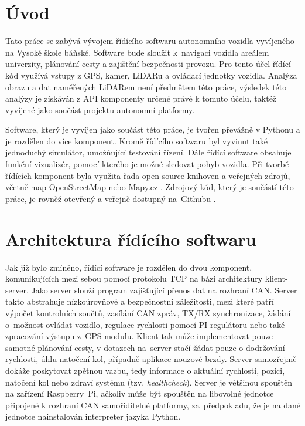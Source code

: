 \documentclass[czech, bachelor]{diploma}
\begin{document}
\MakeTitlePages

\chapter{Úvod} \label{sec:Introduction}
Tato práce se zabývá vývojem řídícího softwaru autonomního vozidla vyvíjeného na Vysoké škole báňské. Software bude sloužit 
k~navigaci vozidla areálem univerzity, plánování cesty a zajištění bezpečnosti provozu. Pro tento účel řídící kód využívá vstupy
z GPS, kamer, LiDARu a ovládací jednotky vozidla. Analýza obrazu a dat naměřených LiDARem není předmětem této práce, výsledek této
analýzy je získáván z API komponenty určené právě k tomuto účelu, taktéž vyvíjené jako součást projektu autonomní platformy.

Software, který je vyvíjen jako součást této práce, je tvořen převážně v Pythonu a je rozdělen do více komponent. Kromě řídícího
softwaru byl vyvinut také jednoduchý simulátor, umožňující testování řízení. Dále řídící software obsahuje funkční vizualizér,
pomocí kterého je možné sledovat pohyb vozidla. Při tvorbě řídících komponent byla využita řada open source knihoven a veřejných
zdrojů, včetně map OpenStreetMap \cite{openstreetmap-source} nebo Mapy.cz \cite{mapycz-source}. Zdrojový kód, který je součástí
této práce, je rovněž otevřený a veřejně dostupný na~Githubu \cite{car-client-source, car-webapp-source,
car-map-downloader-source, car-can-source, car-simulator-source, geologger-source}.

\chapter{Architektura řídícího softwaru} \label{software-architecture}
Jak již bylo zmíněno, řídící software je rozdělen do dvou komponent, komunikujících mezi sebou pomocí protokolu TCP na bázi
architektury klient-server. Jako server slouží program zajišťující přenos dat na rozhraní CAN. Server takto abstrahuje
nízkoúrovňové a bezpečnostní záležitosti, mezi které patří výpočet kontrolních součtů, zasílání CAN zpráv, TX/RX synchronizace,
žádání o~možnost ovládat vozidlo, regulace rychlosti pomocí PI regulátoru nebo také zpracování výstupu z~GPS modulu. Klient tak
může implementovat pouze samotné plánování cesty, v dotazech na~server stačí žádat pouze o dodržování rychlosti, úhlu natočení
kol, případně aplikace nouzové brzdy. Server samozřejmě dokáže poskytovat zpětnou vazbu, tedy informace o aktuální rychlosti,
pozici, natočení kol nebo zdraví systému (tzv. \emph{healthcheck}). Server je většinou spouštěn na zařízení Raspberry~Pi, ačkoliv
může být spouštěn na libovolné jednotce připojené k rozhraní CAN samořiditelné platformy, za~předpokladu, že je na dané jednotce
nainstalován interpreter jazyka Python.
\end{document}
